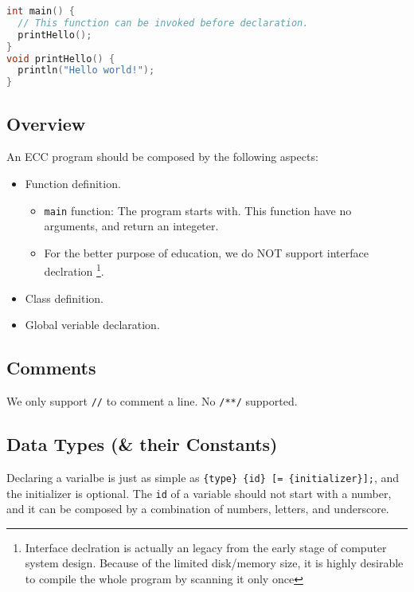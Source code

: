 \documentclass{article}
\begin{document}
\begin{lstlisting}[caption=Hello world!, label=code:hw, language=C]
int main() {
  // This function can be invoked before declaration.
  printHello();
}
void printHello() {
  println("Hello world!");
}
\end{lstlisting}

\subsection{Overview}

An ECC program should be composed by the following aspects:

\begin{itemize}
  \item Function definition.
    \begin{itemize}
      \item \texttt{main} function: The program starts with. This function have no arguments, and return an integeter.
      \item For the better purpose of education, we do NOT support interface declration
	\footnote{Interface declration is actually an legacy from the early stage of computer system design. Because of the
	limited disk/memory size, it is highly desirable to compile the whole program by scanning it only once}.
    \end{itemize}
  \item Class definition.
  \item Global veriable declaration.
\end{itemize}

\subsection{Comments}

We only support \texttt{//} to comment a line. No \texttt{/**/} supported.

\subsection{Data Types (\& their Constants)}
Declaring a varialbe is just as simple as \texttt{\{type\} \{id\} [= \{initializer\}];},
and the initializer is optional. The \texttt{id} of a variable should not start with a
number, and it can be composed by a combination of numbers, letters, and underscore.
\end{document}
